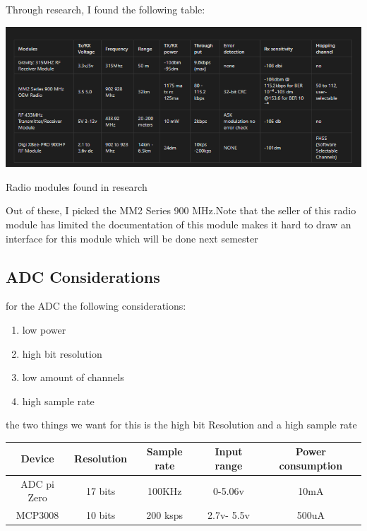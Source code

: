 Through research, I found the following table:
\begin{table}[h!]
	\centering
	\includegraphics[width=0.5\linewidth]{Images/radiomoudles.png}
		
	\caption{Radio modules found in research}
	\label{Radio modules found in research}
	
\end{table}

Out of these, I picked the MM2 Series 900 MHz\cite{freewave}.Note that the seller of this  radio module has  limited the documentation  of this module makes it hard to  draw an interface for this module which will be done  next  semester
\subsection{ADC Considerations}
\label{Adc section}
for the ADC  the following considerations:
\begin{enumerate}
	\item low power
	\item high bit resolution
	\item low amount of channels
	\item high sample rate
\end{enumerate}
the two things we  want  for this is the high bit  Resolution  and  a  high sample rate
\begin{table}[h!]
	\begin{center}
		\begin{tabular}{|c|c|c|c|c|}
			\hline
			Device & Resolution & Sample rate & Input range & Power consumption \\
			\hline
			ADC pi Zero & 17 bits & 100KHz & 0-5.06v & 10mA \\
			MCP3008 & 10 bits & 200 ksps & 2.7v- 5.5v & 500uA \\
			\hline
		\end{tabular}
	\end{center}
\end{table}

